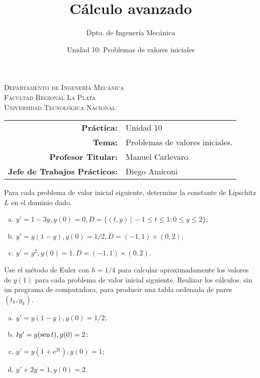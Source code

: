 \documentclass[11pt]{article}
\title{Cálculo avanzado}
\author{Dpto. de Ingenería Mecánica}
\date{Unidad 10: Problemas de valores iniciales}
\begin{document}

\begin{center}
\end{center} 

\begin{center}
\vspace{\baselineskip}
\Large{\textsc{Departamento de Ingenería Mecánica}} \\
\textsc{Facultad Regional La Plata} \\
\textsc{Universidad Tecnológica Nacional}
\end{center}


\begin{center}
\begin{tabular}{r l}
    \textbf{Práctica:} & Unidad 10 \\
 \textbf{Tema:} & Problemas de valores iniciales. \\
 \textbf{Profesor Titular:} & Manuel Carlevaro \\
 \textbf{Jefe de Trabajos Prácticos:} & Diego Amiconi \\
\end{tabular}\end{center}

\vspace{1em}

\begin{question} %
Para cada problema de valor inicial siguiente, determine la constante de Lipschitz $L$ en el dominio dado.
\begin{enumerate}[a)]
    \item $y' = 1 - 3y, y(0) = 0, D = \{(t, y) \, | \, -1 \leq t \leq 1; 0 \leq y \leq 2 \}$;
    \item $y' = y(1-y), y(0) = 1/2, D = (-1, 1) \times (0, 2)$;
    \item $y' = y^2, y(0) = 1, D = (-1, 1) \times (0, 2)$.
\end{enumerate}
\end{question}

\begin{question} %
Use el método de Euler con $h = 1/4$ para calcular aproximadamente los valores de $y(1)$ para cada problema de valor inicial siguiente. Realizar los cálculos, sin un programa de computadora, para producir una tabla ordenada de pares $(t_k, y_k)$.
\begin{enumerate}[a)]
    \item $y' = y(1-y), y(0) = 1/2$;
    \item $t y' = y(\operatorname{sen} t), y(0) = 2$;
    \item $y' = y(1 + e^{2 t}), y(0) = 1$;
    \item $y' + 2 y = 1, y(0) = 2$.
\end{enumerate}
\end{question}
\end{document}
